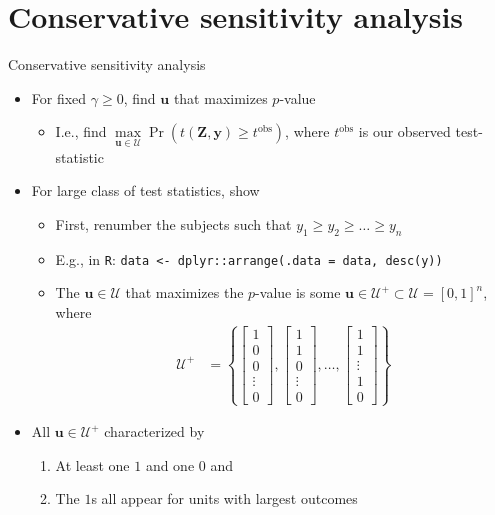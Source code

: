 \documentclass[table, xcolor={dvipsnames}, 9pt]{beamer}
\theoremstyle{newstyle}
\begin{document}
\section{Conservative sensitivity analysis}
\begin{frame}{Conservative sensitivity analysis}
\vfill
\begin{itemize} \vfill
\item For fixed $\gamma \geq 0$, find $\mathbf{u}$ that maximizes $p$-value  \vfill
\begin{itemize} \vfill
\item  I.e., find $\max \limits_{\mathbf{u} \in \mathcal{U}} \Pr\left(t\left(\mathbf{Z}, \mathbf{y}\right) \geq t^{\text{obs}} \right)$, where $t^{\text{obs}}$ is our observed test-statistic \vfill
\end{itemize} \vfill
\item  For large class of test statistics, \citet{rosenbaumkrieger1990} show \vfill
\begin{itemize} \vfill
\item First, renumber the subjects such that $y_1 \geq y_2 \geq \ldots \geq y_n$  \vfill
\item[] E.g., in \texttt{R}: \texttt{data <- dplyr::arrange(.data = data, desc(y))} \vfill
\item The $\mathbf{u} \in \mathcal{U}$ that maximizes the $p$-value is some $\mathbf{u} \in \mathcal{U}^+ \subset \mathcal{U} = \left[0, 1\right]^n$, where  \vfill
\begin{align*}
\mathcal{U}^+ & = \left\{
\begin{bmatrix} 1 \\ 0 \\ 0 \\ \vdots \\ 0 \end{bmatrix},
\begin{bmatrix} 1 \\ 1 \\ 0 \\ \vdots \\ 0 \end{bmatrix},
\ldots , 
\begin{bmatrix} 1 \\ 1 \\ \vdots \\ 1 \\ 0 \end{bmatrix}
\right\}
\end{align*} \vfill
\end{itemize} \vfill
\item  All $\mathbf{u} \in \mathcal{U}^+$ characterized by \vfill
\begin{enumerate}
\item At least one $1$ and one $0$ and \vfill
\item The $1$s all appear for units with largest outcomes \vfill
\end{enumerate}
\end{itemize} \vfill
\end{frame}
\end{document}
